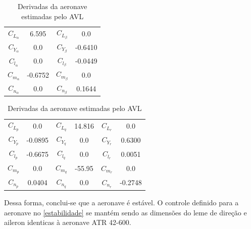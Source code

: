 \begin{table}[H]
\centering
\begin{tabular}{cccc}
\toprule
$ C_{L_{\alpha}} $ &   6.595 & $ C_{L_{\beta}} $ &     0.0  \\ [0.3cm]
$ C_{Y_{\alpha}} $ &     0.0 & $ C_{Y_{\beta}} $ & -0.6410  \\ [0.3cm]
$ C_{l_{\alpha}} $ &     0.0 & $ C_{l_{\beta}} $ & -0.0449  \\ [0.3cm]
$ C_{m_{\alpha}} $ & -0.6752 & $ C_{m_{\beta}} $ &     0.0  \\ [0.3cm]
$ C_{n_{\alpha}} $ &     0.0 & $ C_{n_{\beta}} $ &  0.1644  \\ [0.3cm]
\bottomrule
\end{tabular}
\begin{tabular}{cccccc}
\toprule
$ C_{L_{p}} $ &     0.0 & $ C_{L_{q}} $ & 14.816  & $ C_{L_{r}} $ &   0.0   \\ [0.3cm]
$ C_{Y_{p}} $ & -0.0895 & $ C_{Y_{q}} $ &    0.0  & $ C_{Y_{r}} $ & 0.6300  \\ [0.3cm]
$ C_{l_{p}} $ & -0.6675 & $ C_{l_{q}} $ &    0.0  & $ C_{l_{r}} $ & 0.0051 \\ [0.3cm]
$ C_{m_{p}} $ &     0.0 & $ C_{m_{q}} $ & -55.95  & $ C_{m_{r}} $ &   0.0  \\ [0.3cm]
$ C_{n_{p}} $ &  0.0404 & $ C_{n_{q}} $ &    0.0  & $ C_{n_{r}} $ & -0.2748 \\ [0.3cm]
\bottomrule
\end{tabular}
\caption[Derivadas da aeronave estimadas pelo AVL]{Derivadas da aeronave estimadas pelo AVL}
\label{tbl:derivadas_avl}
\end{table}

Dessa forma, conclui-se que a aeronave é estável. O controle definido para a aeronave no \autoref{estabilidade} se mantém sendo as dimensões do leme de direção e aileron identicas à aeronave ATR 42-600.
